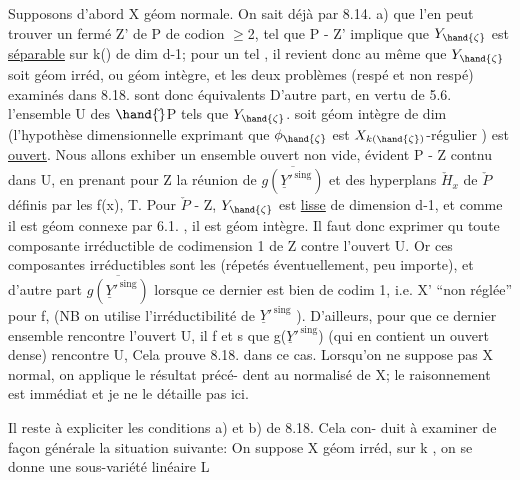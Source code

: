 


Supposons d'abord X géom normale. On sait déjà par 8.14. a)  que
l'en  peut trouver un fermé Z' de P de codion $\geq$2, tel que
\hand{$\zeta\in$} P - Z'  implique que  $Y_{\hand{\zeta}}$  est  \uline{séparable} sur k(\hand{$\zeta$}) de  dim d-1; pour
un tel \hand{$\zeta$} , il revient donc au même que $Y_{\hand{\zeta}}$ soit géom irréd, ou géom
intègre, et  les deux problèmes  (respé et non respé) examinés dans
8.18. sont donc équivalents D'autre part, en vertu de 5.6. l'ensemble
U des \hand{$\zeta\in$} $\hand{\check{}}$P  tels que  $Y_{\hand{\zeta}}$.  soit géom intègre de dim  (l'hypothèse
dimensionnelle exprimant que $\phi_{\hand{\zeta}}$ est $X_{k(\hand{\zeta})}$-régulier ) est \uline{ouvert}.
Nous allons exhiber un ensemble ouvert non vide, évident  P - Z  contnu dans U,
en prenant pour  Z la réunion de  $\overline{g(\underline{Y}'^{\,\mathrm{sing}})}$  et des hyperplans $\check{H}_x$
de $\check{P}$  définis par les  f(x),  T.  Pour \hand{$\zeta\in$} $\check{P}$ - Z,  $Y_{\hand{\zeta}}$  est \uline{lisse}
de dimension d-1, et comme il est géom connexe par 6.1. , il est géom
intègre.  Il faut donc  exprimer qu toute composante irréductible
de codimension  1 de Z  contre l'ouvert U.  Or ces composantes
irréductibles sont les    (répetés éventuellement, peu importe), et
d'autre part $\overline{g(\underline{Y}'^{\,\mathrm{sing}})}$  lorsque  ce dernier  est bien de codim 1, i.e.
X' ``non réglée'' pour f, (NB on utilise l'irréductibilité de  $\underline{Y}'^{\,\mathrm{sing}}$ ).
D'ailleurs, pour que ce dernier ensemble rencontre  l'ouvert U,
il f et s  que  g($\underline{Y}'^{\,\mathrm{sing}}$)  (qui en contient un ouvert dense) rencontre
U,  Cela prouve 8.18. dans ce
cas.  Lorsqu'on ne suppose pas X normal, on applique le résultat précé-%
dent au normalisé de X; le raisonnement est immédiat et je ne le détaille
pas ici.  

Il reste à expliciter  les conditions a) et b) de 8.18. Cela con-%
duit à examiner de façon générale la situation suivante:  On suppose
X géom irréd, sur k , on se donne une sous-variété linéaire  L 

